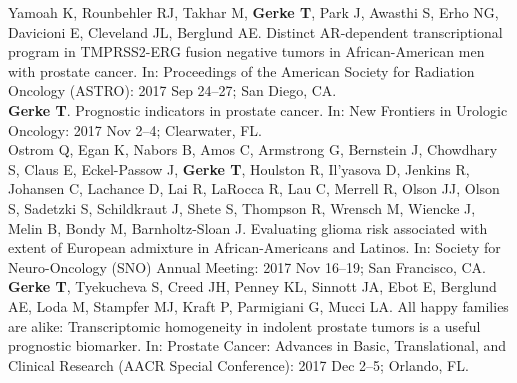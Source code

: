 \documentclass[11pt, a4paper]{article} %
\begin{document}
Yamoah K, Rounbehler RJ, Takhar M, {\bf Gerke T}, Park J, Awasthi S, Erho NG, Davicioni E, Cleveland JL, Berglund AE. Distinct AR-dependent transcriptional program in TMPRSS2-ERG fusion negative tumors in African-American men with prostate cancer. In: Proceedings of the American Society for Radiation Oncology (ASTRO): 2017 Sep 24--27; San Diego, CA.\\

{\bf Gerke T}. Prognostic indicators in prostate cancer. In: New Frontiers in Urologic Oncology: 2017 Nov 2--4; Clearwater, FL.\\

Ostrom Q, Egan K, Nabors B, Amos C, Armstrong G, Bernstein J, Chowdhary S, Claus E, Eckel-Passow J, {\bf Gerke T}, Houlston R, Il'yasova D, Jenkins R, Johansen C, Lachance D, Lai R, LaRocca R, Lau C, Merrell R, Olson JJ, Olson S, Sadetzki S, Schildkraut J, Shete S, Thompson R, Wrensch M, Wiencke J, Melin B, Bondy M, Barnholtz-Sloan J. Evaluating glioma risk associated with extent of European admixture in African-Americans and Latinos. In: Society for Neuro-Oncology (SNO) Annual Meeting: 2017 Nov 16--19; San Francisco, CA.\\

{\bf Gerke T}, Tyekucheva S, Creed JH, Penney KL, Sinnott JA, Ebot E, Berglund AE, Loda M, Stampfer MJ, Kraft P, Parmigiani G, Mucci LA. All happy families are alike: Transcriptomic homogeneity in indolent prostate tumors is a useful prognostic biomarker. In: Prostate Cancer: Advances in Basic, Translational, and Clinical Research (AACR Special Conference): 2017 Dec 2--5; Orlando, FL.
\end{document}
